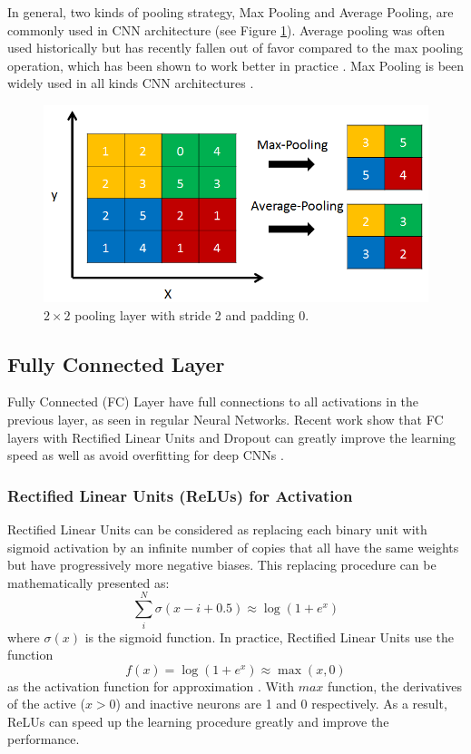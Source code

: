 In general, two kinds of pooling strategy, Max Pooling and Average Pooling, are commonly used in CNN architecture (see Figure \ref{fig:cnn:pool}). Average pooling was often used historically but has recently fallen out of favor compared to the max pooling operation, which has been shown to work better in practice \cite{malmaud2015s} \cite{szegedy2014going}. Max Pooling is been widely used in all kinds CNN architectures \cite{boureau2010theoretical} \cite{yang2009linear}. 
\begin{figure}
\centering
\includegraphics[scale=.8]{cnn/fig/pool.png}
\caption{$2\times2$ pooling layer with stride 2 and padding 0.}\label{fig:cnn:pool}
\end{figure}

\subsection{Fully Connected Layer}
Fully Connected (FC) Layer have full connections to all activations in the previous layer, as seen in regular Neural Networks. Recent work show that FC layers with Rectified Linear Units and Dropout can greatly improve the learning speed as well as avoid overfitting for deep CNNs \cite{hinton2012improving} \cite{nair2010rectified}.
\subsubsection{Rectified Linear Units (ReLUs) for Activation}
Rectified Linear Units can be considered as replacing each binary unit with sigmoid activation by an infinite number of copies that all have the same weights but have progressively more negative biases. This replacing procedure can be mathematically presented as:
\begin{equation}
\sum\limits_i^N {\sigma (x - i + 0.5)}  \approx \log (1 + {e^x})
\end{equation}
where $\sigma(x)$ is the sigmoid function. In practice, Rectified Linear Units use the function 
\begin{equation}
f(x) = \log (1 + {e^x}) \approx \max(x,0) 
\end{equation}\label{eq:cnn:relu}
as the activation function for approximation \cite{jarrett2009best}. With $max$ function, the derivatives of the active ($x>0$) and inactive neurons are 1 and 0 respectively.  As a result, ReLUs can speed up the learning procedure greatly and improve the performance.

